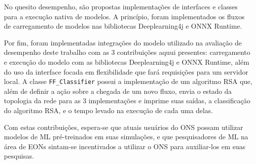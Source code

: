 No quesito desempenho, são propostas implementações de interfaces e classes para a execução nativa de modelos. A princípio, foram implementados os fluxos de carregamento de modelos nas bibliotecas Deeplearning4j e ONNX Runtime.

Por fim, foram implementadas integrações do modelo utilizado na avaliação de desempenho deste trabalho com as 3 contribuições aquui presentes: carregamento e execução do modelo com as bibliotecas Deeplearning4j e ONNX Runtime, além do uso da interface focada em flexibilidade que fará requisições para um servidor local. A classe \texttt{FF\_Classifier} possui a implementação de um algoritmo RSA que, além de definir a ação sobre a chegada de um novo fluxo, envia o estado da topologia da rede para as 3 implementações e imprime suas saídas, a classificação do algoritmo RSA, e o tempo levado na execução de cada uma delas.

Com estas contribuições, espera-se que atuais usuários do ONS possam utilizar modelos de ML pré-treinados em suas simulações, e que pesquisadores de ML na área de EONs sintam-se incentivados a utilizar o ONS para auxiliar-los em suas pesquisas.